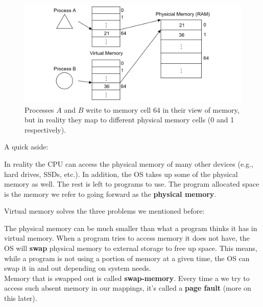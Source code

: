 \begin{figure}[h]
    \centering
    \includegraphics[width=\textwidth]{Sections/virt/virt.png}
    
    \vspace{1em}
    \caption{Processes $A$ and $B$ write to memory cell $64$ in their view of memory, but in reality they map 
    to different physical memory cells (0 and 1 respectively).}
    
    \label{fig:virt2}
\end{figure}

\noindent
A quick aside:

\begin{theo}

    In reality the CPU can access the physical memory of many other devices (e.g., hard drives, SSDs, etc.). In 
    addition, the OS takes up some of the physical memory as well. The rest is left to programs to use. The 
    program allocated space is the memory we refer to going forward as the \textbf{physical memory}.
\end{theo}

\noindent
Virtual memory solves the three problems we mentioned before:
\begin{Def}

    The physical memory can be much smaller than what a program thinks it has in virtual memory. When a program tries to access memory 
    it does not have, the OS will \textbf{swap} physical memory to external storage to free up space. This means, while a program is not using 
    a portion of memory at a given time, the OS can swap it in and out depending on system needs.\\

    \noindent
    Memory that is swapped out is called \textbf{swap-memory}. Every time a we try to access such absent memory 
    in our mappings, it's called a \textbf{page fault} (more on this later).
\end{Def}

